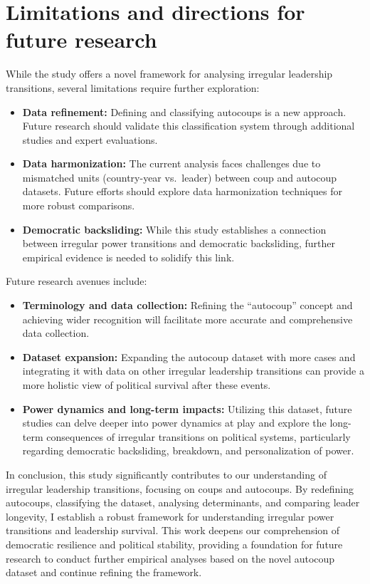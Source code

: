 \documentclass[
  12pt,
]{report}
\begin{document}
\section{Limitations and directions for future
research}\label{limitations-and-directions-for-future-research}

While the study offers a novel framework for analysing irregular
leadership transitions, several limitations require further exploration:

\begin{itemize}
\item
  \textbf{Data refinement:} Defining and classifying autocoups is a new
  approach. Future research should validate this classification system
  through additional studies and expert evaluations.
\item
  \textbf{Data harmonization:} The current analysis faces challenges due
  to mismatched units (country-year vs.~leader) between coup and
  autocoup datasets. Future efforts should explore data harmonization
  techniques for more robust comparisons.
\item
  \textbf{Democratic backsliding:} While this study establishes a
  connection between irregular power transitions and democratic
  backsliding, further empirical evidence is needed to solidify this
  link.
\end{itemize}

Future research avenues include:

\begin{itemize}
\item
  \textbf{Terminology and data collection:} Refining the ``autocoup''
  concept and achieving wider recognition will facilitate more accurate
  and comprehensive data collection.
\item
  \textbf{Dataset expansion:} Expanding the autocoup dataset with more
  cases and integrating it with data on other irregular leadership
  transitions can provide a more holistic view of political survival
  after these events.
\item
  \textbf{Power dynamics and long-term impacts:} Utilizing this dataset,
  future studies can delve deeper into power dynamics at play and
  explore the long-term consequences of irregular transitions on
  political systems, particularly regarding democratic backsliding,
  breakdown, and personalization of power.
\end{itemize}

In conclusion, this study significantly contributes to our understanding
of irregular leadership transitions, focusing on coups and autocoups. By
redefining autocoups, classifying the dataset, analysing determinants,
and comparing leader longevity, I establish a robust framework for
understanding irregular power transitions and leadership survival. This
work deepens our comprehension of democratic resilience and political
stability, providing a foundation for future research to conduct further
empirical analyses based on the novel autocoup dataset and continue
refining the framework.
\end{document}
